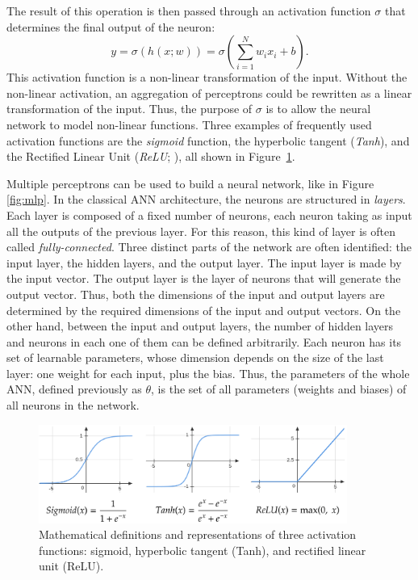 The result of this operation is then passed through an activation function $\sigma$ that determines the final output of the neuron:
\begin{equation}
    y=\sigma\left(h(x;w)\right)=\sigma\left(\sum_{i=1}^Nw_ix_i+b\right).
\end{equation}
This activation function is a non-linear transformation of the input. Without the non-linear activation, an aggregation of perceptrons could be rewritten as a linear transformation of the input. Thus, the purpose of $\sigma$ is to allow the neural network to model non-linear functions. Three examples of frequently used activation functions are the \textit{sigmoid} function, the hyperbolic tangent (\textit{Tanh}), and the Rectified Linear Unit (\textit{ReLU}; \cite{Glorot2011_ReLU}), all shown in Figure~\ref{fig:activ}.

Multiple perceptrons can be used to build a neural network, like in Figure \ref{fig:mlp}. In the classical ANN architecture, the neurons are structured in \textit{layers}. Each layer is composed of a fixed number of neurons, each neuron taking as input all the outputs of the previous layer. For this reason, this kind of layer is often called \textit{fully-connected}. Three distinct parts of the network are often identified: the input layer, the hidden layers, and the output layer. The input layer is made by the input vector. The output layer is the layer of neurons that will generate the output vector. Thus, both the dimensions of the input and output layers are determined by the required dimensions of the input and output vectors. On the other hand, between the input and output layers, the number of hidden layers and neurons in each one of them can be defined arbitrarily. Each neuron has its set of learnable parameters, whose dimension depends on the size of the last layer: one weight for each input, plus the bias. Thus, the parameters of the whole ANN, defined previously as $\theta$, is the set of all parameters (weights and biases) of all neurons in the network. 

\begin{figure}
    \centering
    \includegraphics[width=0.9\textwidth]{Figures/RL/activ.png}
    \caption{Mathematical definitions and representations of three activation functions: sigmoid, hyperbolic tangent (Tanh), and rectified linear unit (ReLU).}
    \label{fig:activ}
\end{figure}

